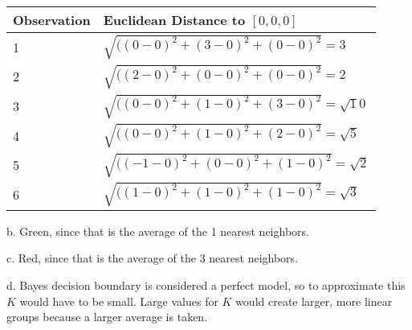 \documentclass[
]{article}
\begin{document}
\begin{enumerate}
  \begin{longtable}[]{@{}ll@{}}
  \toprule
  Observation & Euclidean Distance to \([0,0,0]\)\tabularnewline
  \midrule
  \endhead
  1 & \(\sqrt{((0-0)^2+(3-0)^2+(0-0)^2} = 3\)\tabularnewline
  2 & \(\sqrt{((2-0)^2+(0-0)^2+(0-0)^2} = 2\)\tabularnewline
  3 & \(\sqrt{((0-0)^2+(1-0)^2+(3-0)^2} = \sqrt10\)\tabularnewline
  4 & \(\sqrt{((0-0)^2+(1-0)^2+(2-0)^2} = \sqrt5\)\tabularnewline
  5 & \(\sqrt{((-1-0)^2+(0-0)^2+(1-0)^2} = \sqrt2\)\tabularnewline
  6 & \(\sqrt{((1-0)^2+(1-0)^2+(1-0)^2} = \sqrt3\)\tabularnewline
  \bottomrule
  \end{longtable}

  b. Green, since that is the average of the 1 nearest neighbors.

  c. Red, since that is the average of the 3 nearest neighbors.

  d. Bayes decision boundary is considered a perfect model, so to
  approximate this \(K\) would have to be small. Large values for \(K\)
  would create larger, more linear groups because a larger average is
  taken.
\end{enumerate}
\end{document}
